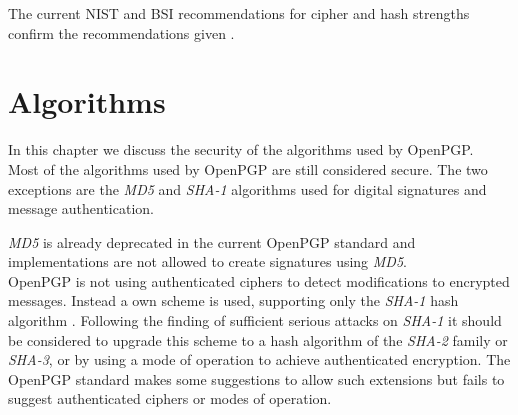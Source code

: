 The current NIST and BSI recommendations for cipher and hash strengths confirm the recommendations given \cite{keylenNIST} \cite{KeylenBSI}. 

\section{Algorithms}

In this chapter we discuss the security of the algorithms used by OpenPGP.  \\




Most of the algorithms used by OpenPGP are still considered secure. 
The two exceptions are the \textit{MD5} \citep{XieLF13} and \textit{SHA-1} \citep{stevens2012attacks} algorithms used for digital signatures and message authentication. 

\textit{MD5} is already deprecated in the current OpenPGP standard \citep[section 14]{RFC4880} and implementations are not allowed to create signatures using \textit{MD5}.   \\

OpenPGP is not using authenticated ciphers to detect modifications to encrypted messages.
Instead a own scheme is used, supporting only the \textit{SHA-1} hash algorithm \citep[section 5.13]{RFC4880}. 
Following the finding of sufficient serious attacks on \textit{SHA-1} \cite{stevens2012attacks} it should be considered to upgrade this scheme to a hash algorithm of the \textit{SHA-2} family or \textit{SHA-3}, or by using a mode of operation to achieve authenticated encryption. The OpenPGP standard makes some suggestions to allow such extensions \citep[section 13.11]{RFC4880} but fails to suggest authenticated ciphers or modes of operation.




